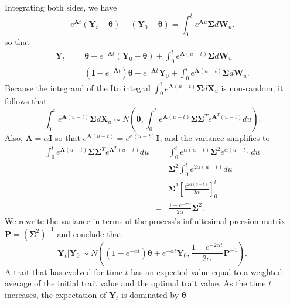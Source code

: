 \documentclass[12pt]{article}
\begin{document}
Integrating both sides, we have
\begin{equation*}
 e^{\textbf{A} t} ( \textbf{Y}_t - \boldsymbol \theta) - (\textbf{Y}_0 - \boldsymbol \theta) = \int_{0}^{t}  e^{\textbf{A} u} \boldsymbol \Sigma d \textbf{W}_u .
\end{equation*}
so that
\begin{eqnarray*}
  \textbf{Y}_t & = & \boldsymbol \theta + e^{-\textbf{A}t} (\textbf{Y}_0 - \boldsymbol \theta) + \int_{0}^{t}  e^{\textbf{A} (u-t)} \boldsymbol \Sigma d \textbf{W}_u \\
  & = & ( \textbf{I} - e^{-\textbf{A}t} ) \boldsymbol \theta + e^{-\textbf{A}t}\textbf{Y}_0 + \int_{0}^{t}  e^{\textbf{A}(u-t)} \boldsymbol \Sigma d \textbf{W}_u .
\end{eqnarray*}
Because the integrand of the Ito integral $\int_{0}^{t}  e^{\textbf{A}(u-t)}\boldsymbol \Sigma d \textbf{X}_u$ is non-random, it follows that
\begin{equation*}
\int_{0}^{t}  e^{\textbf{A}(u-t)} \boldsymbol \Sigma d \textbf{X}_u \sim N \left( \textbf{0}, \int_{0}^{t}  e^{\textbf{A}(u-t)}\boldsymbol \Sigma \boldsymbol \Sigma^T e^{\textbf{A}^T (u-t)} du    \right) .
\end{equation*}
Also, $\textbf{A} = \alpha \textbf{I}$ so that $e^{\textbf{A}(u-t)} = e^{\alpha(u-t)}\textbf{I}$, and the variance simplifies to
\begin{eqnarray*}
\int_{0}^{t}  e^{\textbf{A}(u-t)}\boldsymbol \Sigma \boldsymbol \Sigma^T e^{\textbf{A}^T (u-t)} du & = & \int_{0}^{t}  e^{\alpha (u-t)}\boldsymbol \Sigma^2 e^{\alpha (u-t)} du \\
& = &   \boldsymbol \Sigma^2 \int_{0}^{t} e^{2\alpha(u-t)} du \\
 & = & \boldsymbol \Sigma^2 \left[ \frac{e^{2\alpha(u-t)}}{2\alpha}     \right]_0^t \\
 & = &  \frac{1 - e^{-2\alpha t}}{2 \alpha} \boldsymbol \Sigma^2 .
\end{eqnarray*} 
We rewrite the variance in terms of the process's infinitesimal precsion matrix $\textbf{P} = (\boldsymbol \Sigma^2)^{-1} $ and conclude that
\begin{equation*}
\textbf{Y}_t | \textbf{Y}_0 \sim N \left(( 1 - e^{- \alpha t} ) \boldsymbol \theta + e^{- \alpha t}\textbf{Y}_0, \frac{1 - e^{-2\alpha t}}{2 \alpha} \textbf{P}^{-1} \right) .
\end{equation*}
A trait that has evolved for time $t$ has an expected value equal to a weighted average of the initial trait value
and the optimal trait value.  As the time $t$ increases, the expectation of $\textbf{Y}_t$ is dominated by $\boldsymbol \theta$  
\end{document}
